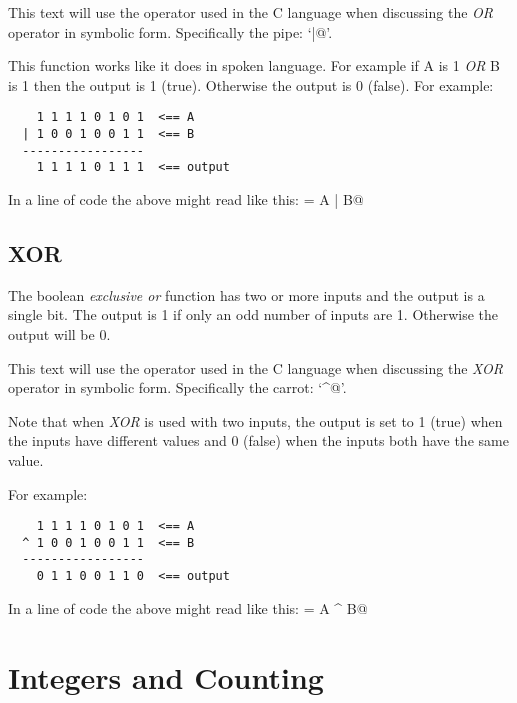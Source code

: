 This text will use the operator used in the C language when discussing
the {\em OR}  operator in symbolic form.  Specifically the pipe: `\verb@|@'.

This function works like it does in spoken language.  For example
if A is 1 {\em OR} B is 1 then the output is 1 (true).
Otherwise the output is 0 (false).  For example:

\begin{verbatim}
    1 1 1 1 0 1 0 1  <== A
  | 1 0 0 1 0 0 1 1  <== B
  -----------------
    1 1 1 1 0 1 1 1  <== output
\end{verbatim}

In a line of code the above might read like this: \verb@output = A | B@

\subsection{XOR}

The boolean {\em exclusive or} function has two or more inputs and the 
output is a single bit.  The output is 1 if only an odd number of inputs 
are 1. Otherwise the output will be 0.

This text will use the operator used in the C language when discussing
the {\em XOR}  operator in symbolic form.  Specifically the carrot: `\verb@^@'.

Note that when {\em XOR} is used with two inputs, the output
is set to 1 (true) when the inputs have different values and 0 
(false) when the inputs both have the same value.

For example:

\begin{verbatim}
    1 1 1 1 0 1 0 1  <== A
  ^ 1 0 0 1 0 0 1 1  <== B
  -----------------
    0 1 1 0 0 1 1 0  <== output
\end{verbatim}

In a line of code the above might read like this: \verb@output = A ^ B@


\section{Integers and Counting}

